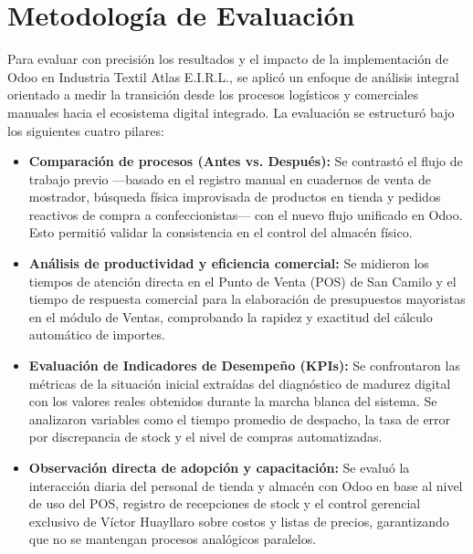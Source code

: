 \section{Metodología de Evaluación}

Para evaluar con precisión los resultados y el impacto de la implementación de Odoo en Industria Textil Atlas E.I.R.L., se aplicó un enfoque de análisis integral orientado a medir la transición desde los procesos logísticos y comerciales manuales hacia el ecosistema digital integrado. La evaluación se estructuró bajo los siguientes cuatro pilares:

\begin{itemize}
    \item \textbf{Comparación de procesos (Antes vs. Después):} Se contrastó el flujo de trabajo previo ---basado en el registro manual en cuadernos de venta de mostrador, búsqueda física improvisada de productos en tienda y pedidos reactivos de compra a confeccionistas--- con el nuevo flujo unificado en Odoo. Esto permitió validar la consistencia en el control del almacén físico.
    \item \textbf{Análisis de productividad y eficiencia comercial:} Se midieron los tiempos de atención directa en el Punto de Venta (POS) de San Camilo y el tiempo de respuesta comercial para la elaboración de presupuestos mayoristas en el módulo de Ventas, comprobando la rapidez y exactitud del cálculo automático de importes.
    \item \textbf{Evaluación de Indicadores de Desempeño (KPIs):} Se confrontaron las métricas de la situación inicial extraídas del diagnóstico de madurez digital con los valores reales obtenidos durante la marcha blanca del sistema. Se analizaron variables como el tiempo promedio de despacho, la tasa de error por discrepancia de stock y el nivel de compras automatizadas.
    \item \textbf{Observación directa de adopción y capacitación:} Se evaluó la interacción diaria del personal de tienda y almacén con Odoo en base al nivel de uso del POS, registro de recepciones de stock y el control gerencial exclusivo de Víctor Huayllaro sobre costos y listas de precios, garantizando que no se mantengan procesos analógicos paralelos.
\end{itemize}

